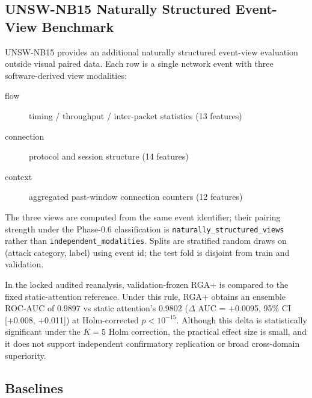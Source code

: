 \documentclass[11pt]{article}
\begin{document}
\subsection{UNSW-NB15 Naturally Structured Event-View Benchmark}
\label{sec:unsw-paired}

UNSW-NB15 provides an additional naturally structured event-view
evaluation outside visual paired data. Each row is a single network
event with three software-derived view modalities:

\begin{description}
  \item[flow] timing / throughput / inter-packet statistics (13 features)
  \item[connection] protocol and session structure (14 features)
  \item[context] aggregated past-window connection counters (12 features)
\end{description}

The three views are computed from the same event identifier; their
pairing strength under the Phase-0.6 classification is
\texttt{naturally\_structured\_views} rather than
\texttt{independent\_modalities}. Splits are stratified random draws
on (attack category, label) using event id; the test fold is disjoint
from train and validation.


In the locked audited reanalysis, validation-frozen RGA+ is compared to the fixed static-attention reference. Under this rule, RGA+ obtains an ensemble ROC-AUC of 0.9897 vs static attention's 0.9802 ($\Delta$ AUC = +0.0095, 95\% CI [+0.008, +0.011]) at Holm-corrected $p < 10^{-15}$. Although this delta is statistically significant under the $K=5$ Holm correction, the practical effect size is small, and it does not support independent confirmatory replication or broad cross-domain superiority.

\subsection{Baselines}
\end{document}
